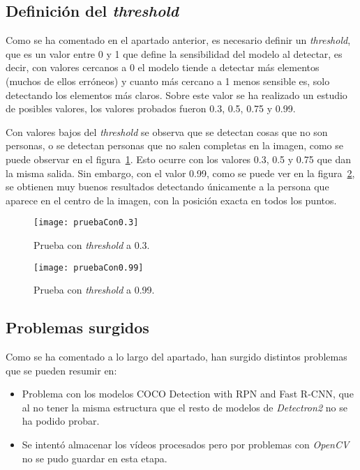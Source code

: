 \subsection{Definición del \textit{threshold}}
Como se ha comentado en el apartado anterior, es necesario definir un \textit{threshold}, que es un valor entre 0 y 1 que define la sensibilidad del modelo al detectar, es decir, con valores cercanos a 0 el modelo tiende a detectar más elementos (muchos de ellos erróneos) y cuanto más cercano a 1 menos sensible es, solo detectando los elementos más claros. Sobre este valor se ha realizado un estudio de posibles valores, los valores probados fueron 0.3, 0.5, 0.75 y 0.99.

Con valores bajos del \textit{threshold} se observa que se detectan cosas que no son personas, o se detectan personas que no salen completas en la imagen, como se puede observar en el figura~\ref{fig:pruebaCon0.3}. Esto ocurre con los valores 0.3, 0.5 y 0.75 que dan la misma salida. Sin embargo, con el valor 0.99, como se puede ver en la figura~\ref{fig:pruebaCon0.99}, se obtienen muy buenos resultados detectando únicamente a la persona que aparece en el centro de la imagen, con la posición exacta en todos los puntos.

\begin{figure}[h]
	\centering
	\texttt{[image: pruebaCon0.3]}
	\caption{Prueba con \textit{threshold} a 0.3.}
	\label{fig:pruebaCon0.3}
\end{figure}

\begin{figure}[h]
	\centering
	\texttt{[image: pruebaCon0.99]}
	\caption{Prueba con \textit{threshold} a 0.99.}
	\label{fig:pruebaCon0.99}
\end{figure}

\subsection{Problemas surgidos}
Como se ha comentado a lo largo del apartado, han surgido distintos problemas que se pueden resumir en:
\begin{itemize}
	\item Problema con los modelos COCO Detection with RPN and Fast R-CNN, que al no tener la misma estructura que el resto de modelos de \textit{Detectron2} no se ha podido probar.
	\item Se intentó almacenar los vídeos procesados pero por problemas con \textit{OpenCV} no se pudo guardar en esta etapa.
\end{itemize}

